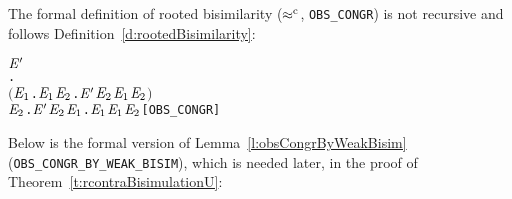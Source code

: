 The formal definition of rooted bisimilarity ($\mathrel{\approx^{\rm{c}}}$, \texttt{OBS_CONGR}) 
is not recursive and follows Definition~\ref{d:rootedBisimilarity}:
\begin{alltt}
    \HOLSymConst{\HOLTokenObsCongr} \ensuremath{\HOLFreeVar{E}\sp{\prime}} \HOLTokenDefEquality{}
     \HOLSymConst{\HOLTokenForall{}}.
         \ensuremath{(}\HOLSymConst{\HOLTokenForall{}}\ensuremath{\HOLBoundVar{E}\sb{\mathrm{1}}}.  \HOLTokenTransBegin{}\HOLTokenTransEnd \ensuremath{\HOLBoundVar{E}\sb{\mathrm{1}}} \HOLSymConst{\HOLTokenImp{}} \HOLSymConst{\HOLTokenExists{}}\ensuremath{\HOLBoundVar{E}\sb{\mathrm{2}}}. \ensuremath{\HOLFreeVar{E}\sp{\prime}} \HOLTokenWeakTransBegin{}\HOLTokenWeakTransEnd \ensuremath{\HOLBoundVar{E}\sb{\mathrm{2}}} \HOLSymConst{\HOLTokenConj{}} \ensuremath{\HOLBoundVar{E}\sb{\mathrm{1}}} \HOLSymConst{\HOLTokenWeakEQ} \ensuremath{\HOLBoundVar{E}\sb{\mathrm{2}}}\ensuremath{)} \HOLSymConst{\HOLTokenConj{}}
         \HOLSymConst{\HOLTokenForall{}}\ensuremath{\HOLBoundVar{E}\sb{\mathrm{2}}}. \ensuremath{\HOLFreeVar{E}\sp{\prime}} \HOLTokenTransBegin{}\HOLTokenTransEnd \ensuremath{\HOLBoundVar{E}\sb{\mathrm{2}}} \HOLSymConst{\HOLTokenImp{}} \HOLSymConst{\HOLTokenExists{}}\ensuremath{\HOLBoundVar{E}\sb{\mathrm{1}}}.  \HOLTokenWeakTransBegin{}\HOLTokenWeakTransEnd \ensuremath{\HOLBoundVar{E}\sb{\mathrm{1}}} \HOLSymConst{\HOLTokenConj{}} \ensuremath{\HOLBoundVar{E}\sb{\mathrm{1}}} \HOLSymConst{\HOLTokenWeakEQ} \ensuremath{\HOLBoundVar{E}\sb{\mathrm{2}}}\hfill{[OBS_CONGR]}
\end{alltt}
Below is the formal version of Lemma~\ref{l:obsCongrByWeakBisim}
(\texttt{OBS_CONGR_BY_WEAK_BISIM}), which is needed later, in the proof
of Theorem~\ref{t:rcontraBisimulationU}:
